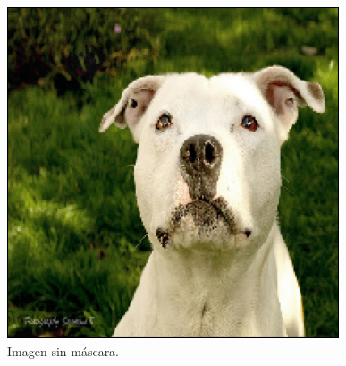 \documentclass[a4paper]{article}
\newcommand\imgScale {0.6}
\begin{document}
\begin{figure}[hbtp]
    \centering
    \includegraphics[scale=\imgScale]{img/originalImg.png}
    \caption{\small Imagen sin m\'ascara.}
    \label{fig:origImg}
\end{figure}
\end{document}
